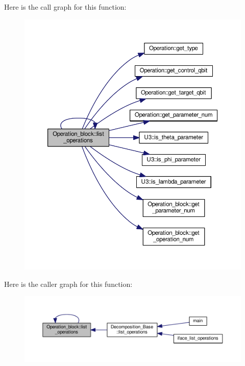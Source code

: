 Here is the call graph for this function\+:
\nopagebreak
\begin{figure}[H]
\begin{center}
\leavevmode
\includegraphics[width=350pt]{class_operation__block_a29e2c74d7fa7344193a17e39248eb803_cgraph}
\end{center}
\end{figure}




Here is the caller graph for this function\+:
\nopagebreak
\begin{figure}[H]
\begin{center}
\leavevmode
\includegraphics[width=350pt]{class_operation__block_a29e2c74d7fa7344193a17e39248eb803_icgraph}
\end{center}
\end{figure}


